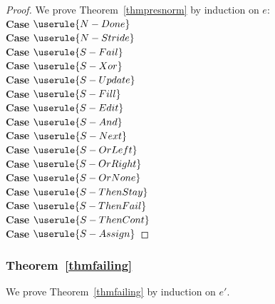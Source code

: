 \begin{proof}
  We prove Theorem~\ref{thmpresnorm} by induction on $e$:\\

  \noindent\textbf{Case} $\userule{N-Done}$\\

  \noindent\textbf{Case} $\userule{N-Stride}$\\

  \noindent\textbf{Case} $\userule{S-Fail}$ \\

  \noindent\textbf{Case} $\userule{S-Xor}$ \\

  \noindent\textbf{Case} $\userule{S-Update}$ \\

  \noindent\textbf{Case} $\userule{S-Fill}$ \\

  \noindent\textbf{Case} $\userule{S-Edit}$ \\

  \noindent\textbf{Case} $\userule{S-And}$ \\

  \noindent\textbf{Case} $\userule{S-Next}$ \\

  \noindent\textbf{Case} $\userule{S-OrLeft}$ \\

  \noindent\textbf{Case} $\userule{S-OrRight}$ \\

  \noindent\textbf{Case} $\userule{S-OrNone}$\\

  \noindent\textbf{Case} $\userule{S-ThenStay}$\\

  \noindent\textbf{Case} $\userule{S-ThenFail}$\\

  \noindent\textbf{Case} $\userule{S-ThenCont}$\\

  \noindent\textbf{Case} $\userule{S-Assign}$

\end{proof}

\subsubsection{Theorem~\ref{thmfailing}}

We prove Theorem~\ref{thmfailing} by induction on $e'$.

